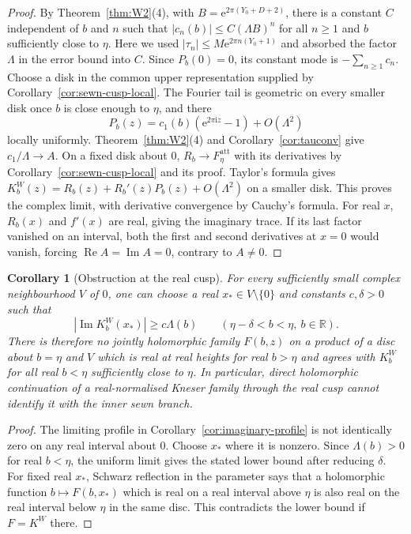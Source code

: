 \documentclass[11pt]{amsart}
\newtheorem{corollary}[theorem]{Corollary}
\theoremstyle{definition}
\newcommand{\Rr}{R}
\newcommand{\Kk}{K}
\newcommand{\eee}{\mathrm{e}}
\newcommand{\ii}{\mathrm{i}}
\begin{document}
\begin{proof}
By Theorem~\ref{thm:W2}(4), with
$B=\eee^{2\pi(Y_0+D+2)}$, there is a constant $C$ independent of $b$ and
$n$ such that $|c_n(b)|\le C(\Lambda B)^n$ for all $n\ge1$ and $b$ sufficiently
close to $\eta$.  Here we used $|\tau_n|\le M\eee^{2\pi n(Y_0+1)}$ and
absorbed the factor $\Lambda$ in the error bound into $C$.
Since $P_b(0)=0$, its constant mode is $-\sum_{n\ge1}c_n$.
Choose a disk in the common upper representation supplied by
Corollary~\ref{cor:sewn-cusp-local}.  The Fourier tail is geometric
on every smaller disk once $b$ is close enough to $\eta$, and there
\[
 P_b(z)=c_1(b)(\eee^{2\pi\ii z}-1)+O(\Lambda^2)
\]
locally uniformly.  Theorem~\ref{thm:W2}(4) and
Corollary~\ref{cor:tauconv} give $c_1/\Lambda\to A$.
On a fixed disk about $0$, $\Rr_b\to F_\eta^{\mathrm{att}}$ with its
derivatives by Corollary~\ref{cor:sewn-cusp-local} and its proof.
Taylor's formula gives
$\Kk_b^W(z)=\Rr_b(z)+\Rr_b'(z)P_b(z)+O(\Lambda^2)$
on a smaller disk.  This proves the complex limit, with derivative
convergence by Cauchy's formula.  For real $x$, $\Rr_b(x)$ and $f'(x)$
are real, giving the imaginary trace.
If its last factor vanished on an interval, both the first and second
derivatives at $x=0$ would vanish, forcing $\operatorname{Re}A=
\operatorname{Im}A=0$, contrary to $A\ne0$.
\end{proof}

\begin{corollary}[Obstruction at the real cusp]
\label{cor:cusp-real-obstruction}
For every sufficiently small complex neighbourhood $V$ of $0$, one can
choose a real $x_*\in V\setminus\{0\}$ and constants $c,\delta>0$ such that
\[
 |\operatorname{Im}\Kk_b^W(x_*)|\ge c\Lambda(b)
 \qquad(\eta-\delta<b<\eta,\ b\in\mathbb R).
\]
There is therefore no jointly holomorphic family $F(b,z)$ on a product
of a disc about $b=\eta$ and $V$ which is real at real heights for real
$b>\eta$ and agrees with $\Kk_b^W$ for all real $b<\eta$ sufficiently
close to $\eta$.  In particular, direct holomorphic continuation of a
real-normalised Kneser family through the real cusp cannot identify it
with the inner sewn branch.
\end{corollary}

\begin{proof}
The limiting profile in Corollary~\ref{cor:imaginary-profile} is not
identically zero on any real interval about $0$.  Choose $x_*$ where it
is nonzero.  Since $\Lambda(b)>0$ for real $b<\eta$, the uniform limit
gives the stated lower bound after reducing $\delta$.
For fixed real $x_*$, Schwarz reflection in the parameter says that a
holomorphic function $b\mapsto F(b,x_*)$ which is real on a real interval
above $\eta$ is also real on the real interval below $\eta$ in the same
disc.  This contradicts the lower bound if $F=\Kk^W$ there.
\end{proof}
\end{document}
